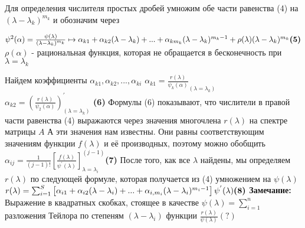 \documentclass{article}
\begin{document}
Для определения числителя простых дробей умножим обе части равенства (4) на 
\((\lambda - \lambda_{k})^{m_{k}}\) и обозначим через \newline

\(\psi^{2}(\alpha) = \frac{\psi(\lambda)}{(\lambda - \lambda_{k})^{m_{k}}} \mapsto 
\alpha_{k1} + \alpha_{k2}(\lambda - \lambda_{k}) + ... + \alpha_{km_{k}}(\lambda - \lambda_{k})^{m_{k}-1} + \rho (\lambda) (\lambda-\lambda_{k})^{m_{k}}\newline\textbf{(5)}\)\newline
\newline
\(\rho(\alpha)\) - рациональная функция, которая не обращается в бесконечность при \(\lambda = \lambda_{k}\)\newline

Найдем коэффициенты \(\alpha_{k1}, \alpha_{k2}, ..., \alpha_{ki}\)\newline
\newline
\(\alpha_{k1} = \frac{r(\lambda)}{\psi_{k}(\alpha)}_{\left ( \lambda = \lambda_{k} \right )}\)
\(\alpha_{k2} = (\frac{r(\lambda)}{\psi_{2}(\alpha)})^{'}_{\left ( \lambda = \lambda_{k} \right )}\) \textbf{(6)}\newline
\newline
Формулы (6) показывают, что числители в правой части равенства (4) выражаются через значения многочлена \(r(\lambda)\) на спектре матрицы \(A\)\newline
\newline
А эти значения нам известны. Они равны соответствующим значениям функции \(f(\lambda)\) и её производных, поэтому можно обобщить \newline
\newline
\(\alpha_{ij} = \frac{1}{(j-1)!} \left [ \frac{f(\lambda)}{\psi^{'}(\lambda)} \right]^{(j-1)}_{\lambda = \lambda_{i}}  \)\textbf{(7)}\newline
\newline
После того, как все \(\lambda\) найдены, мы определяем \(r(\lambda)\) по следующей формуле, которая получается из (4) умножением на \(\psi(\lambda)\)\newline
\newline
\(r(\lambda) = \sum _{i = 1} ^{S} \left [ \alpha_{i1} + \alpha_{i2}(\lambda - \lambda_{i}) + ... + \alpha_{i, m_{i}}(\lambda - \lambda_{i})^{m_{i}-1}\right] \psi^{'}(\lambda) \textbf{(8)}\newline\)
\newline
\textbf{Замечание:}\newline
Выражение в квадратных скобках, стоящее в качестве \(\psi(\lambda) = \sum_{i = 1}^{n}\) разложения Тейлора по степеням \((\lambda - \lambda_{i})\) функции \(\frac{r(\lambda)}{\psi(\lambda)} (?)\)\newline
\end{document}
